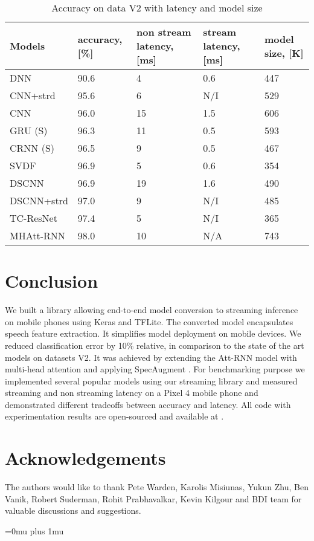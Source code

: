 \documentclass[a4paper]{article}
\begin{document}
\begin{table}[t]
  \caption{Accuracy on data V2 with latency and model size}
  \label{tab:accuracy_latency_size}
  \centering
  \begin{tabular}{p{1.7cm} p{1.10cm} p{1.15cm} p{1.10cm} p{0.90cm}}
    \toprule
    \textbf{Models} &
    \textbf{accuracy, [\%]} &
    \textbf{non stream latency, [ms]} &
    \textbf{stream latency, [ms]} &
    \textbf{model size, [K]}  \\
    \midrule
      DNN        & 90.6  & 4  & 0.6  & 447 \\
      CNN+strd   & 95.6  & 6  & N/I  & 529 \\
      CNN        & 96.0  & 15 & 1.5  & 606 \\
      GRU (S)    & 96.3  & 11 & 0.5  & 593 \\
      CRNN (S)   & 96.5  & 9  & 0.5  & 467 \\
      SVDF       & 96.9  & 5  & 0.6  & 354 \\
      DSCNN      & 96.9  & 19 & 1.6  & 490 \\
      DSCNN+strd & 97.0  & 9  & N/I  & 485 \\
      TC-ResNet  & 97.4  & 5  & N/I  & 365 \\
      MHAtt-RNN  & 98.0  & 10 & N/A  & 743 \\
    \bottomrule
  \end{tabular}
  \vspace{-5mm} \end{table}


\section{Conclusion}

We built a library allowing end-to-end model conversion to streaming inference on mobile phones using Keras and TFLite. The converted model encapsulates speech feature extraction. It simplifies model deployment on mobile devices. We reduced classification error by 10\% relative, in comparison to the state of the art models on datasets V2. It was achieved by extending the Att-RNN\cite{ATT2} model with multi-head attention and applying SpecAugment \cite{SPEC}. For benchmarking purpose we implemented several popular models using our streaming library and measured streaming and non streaming latency on a Pixel 4 mobile phone and demonstrated different tradeoffs between accuracy and latency. All code with experimentation results are open-sourced and available at \cite{OPEN}.

\section{Acknowledgements}

The authors would like to thank Pete Warden, Karolis Misiunas, Yukun Zhu, Ben Vanik, Robert Suderman, Rohit Prabhavalkar, Kevin Kilgour and BDI team for valuable discussions and suggestions.

\Urlmuskip=0mu plus 1mu\relax


\end{document}
